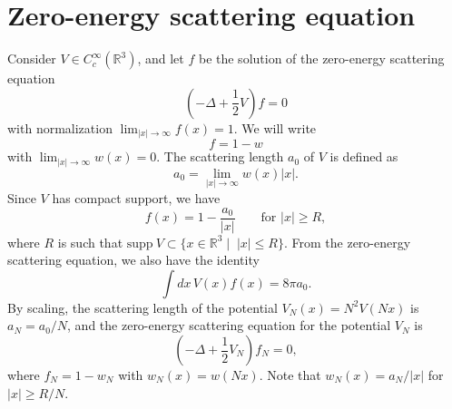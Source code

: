 \documentclass[11pt,a4paper]{scrartcl}
\newcommand{\R}{\mathds{R}}
\begin{document}
\section{Zero-energy scattering equation}


Consider $V \in C_c^\infty(\R^3)$, and let $f$ be the solution of the
zero-energy scattering equation
\[
  \left( -\Delta + \frac{1}{2} V \right) f = 0
\]
with normalization $\lim_{|x|\to\infty} f(x) = 1$. We will write
\[
  f = 1 - w
\]
with $\lim_{|x|\to\infty} w(x) = 0$. The scattering length $a_0$ of $V$ is
defined as
\[
  a_0 = \lim_{|x| \to \infty} w(x)|x|.
\]
Since $V$ has compact support, we have
\[
  f(x) = 1 - \frac{a_0}{|x|} \qquad \text{for } |x| \ge R,
\]
where $R$ is such that $\text{supp} \ V \subset \{ x \in \R^3 \; | \;\; |x|
\le R \}$. From the zero-energy scattering equation, we also have the identity
\[
  \int dx \, V(x) f(x) = 8 \pi a_0.
\]
By scaling, the scattering length of the potential $V_N(x) = N^2 V(Nx)$ is
$a_N = a_0/N$, and the zero-energy scattering equation for the potential $V_N$
is
\begin{equation} \label{eq:scattering}
  \left( -\Delta + \frac{1}{2} V_N \right) f_N = 0,
\end{equation}
where $f_N = 1 - w_N$ with $w_N(x) = w(Nx)$. Note that $w_N(x) = a_N/|x|$ for
$|x| \ge R/N$.
\end{document}
